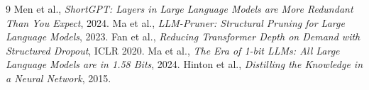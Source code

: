 \documentclass[11pt]{article}
\begin{document}

\begin{thebibliography}{9}
Men et al., \emph{ShortGPT: Layers in Large Language Models are More
Redundant Than You Expect}, 2024.
Ma et al., \emph{LLM-Pruner: Structural Pruning for Large Language Models},
2023.
Fan et al., \emph{Reducing Transformer Depth on Demand with Structured
Dropout}, ICLR 2020.
Ma et al., \emph{The Era of 1-bit LLMs: All Large Language Models are in
1.58 Bits}, 2024.
Hinton et al., \emph{Distilling the Knowledge in a Neural Network}, 2015.
\end{thebibliography}
\end{document}
